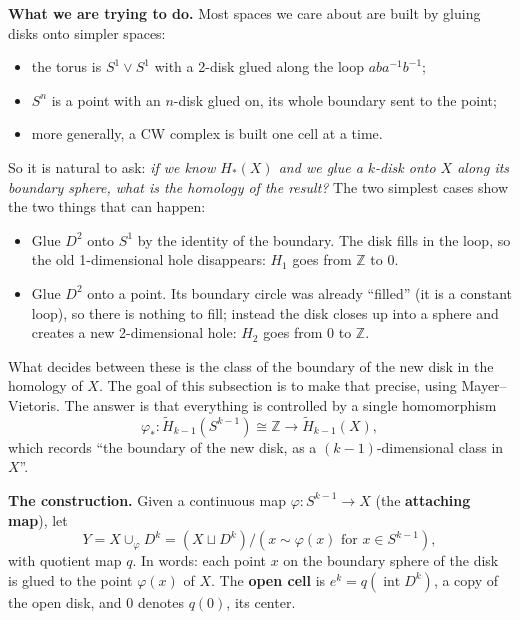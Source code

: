 \documentclass[11pt]{article}
\newcommand{\Z}{\mathbb Z}
\newcommand{\Hred}{\tilde H}
\newcommand{\fig}[2]{\begin{center}\resizebox{#2}{!}{}\end{center}}
\theoremstyle{definition}
\begin{document}
\medskip\noindent\textbf{What we are trying to do.} Most spaces we care about are built by gluing disks onto simpler spaces:
\begin{itemize}
\item the torus is $S^1\vee S^1$ with a 2-disk glued along the loop $aba^{-1}b^{-1}$;
\item $S^n$ is a point with an $n$-disk glued on, its whole boundary sent to the point;
\item more generally, a CW complex is built one cell at a time.
\end{itemize}
So it is natural to ask: \emph{if we know $H_*(X)$ and we glue a $k$-disk onto $X$ along its boundary sphere, what is the homology of the result?} The two simplest cases show the two things that can happen:
\fig{cell-examples}{0.8\textwidth}
\begin{itemize}
\item Glue $D^2$ onto $S^1$ by the identity of the boundary. The disk fills in the loop, so the old 1-dimensional hole disappears: $H_1$ goes from $\Z$ to $0$.
\item Glue $D^2$ onto a point. Its boundary circle was already ``filled'' (it is a constant loop), so there is nothing to fill; instead the disk closes up into a sphere and creates a new 2-dimensional hole: $H_2$ goes from $0$ to $\Z$.
\end{itemize}
What decides between these is the class of the boundary of the new disk in the homology of $X$. The goal of this subsection is to make that precise, using Mayer--Vietoris. The answer is that everything is controlled by a single homomorphism
\[\varphi_*:\Hred_{k-1}(S^{k-1})\cong\Z\longrightarrow\Hred_{k-1}(X),\]
which records ``the boundary of the new disk, as a $(k-1)$-dimensional class in $X$''.

\medskip\noindent\textbf{The construction.} Given a continuous map $\varphi:S^{k-1}\to X$ (the \textbf{attaching map}), let
\[Y=X\cup_\varphi D^k=(X\sqcup D^k)/(x\sim\varphi(x)\text{ for }x\in S^{k-1}),\]
with quotient map $q$. In words: each point $x$ on the boundary sphere of the disk is glued to the point $\varphi(x)$ of $X$. The \textbf{open cell} is $e^k=q(\operatorname{int}D^k)$, a copy of the open disk, and $0$ denotes $q(0)$, its center.
\end{document}
